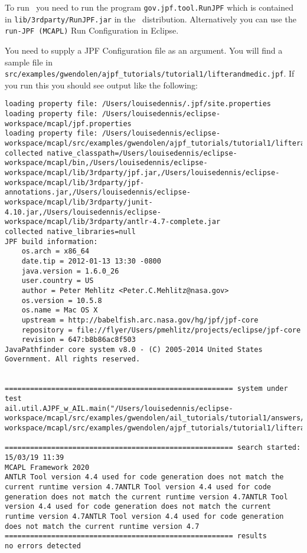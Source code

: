 To run \ajpf\ you need to run the program \texttt{gov.jpf.tool.RunJPF} which is contained in \texttt{lib/3rdparty/RunJPF.jar} in the \mcapl\ distribution.  Alternatively you can use the \texttt{run-JPF (MCAPL)} Run Configuration in Eclipse.

You need to supply a JPF Configuration file as an argument.  You will find a sample file in \texttt{src/examples/gwendolen/ajpf\_tutorials/tutorial1/lifterandmedic.jpf}.  If you run this you should see output like the following:

\begin{verbatim}
loading property file: /Users/louisedennis/.jpf/site.properties
loading property file: /Users/louisedennis/eclipse-workspace/mcapl/jpf.properties
loading property file: /Users/louisedennis/eclipse-workspace/mcapl/src/examples/gwendolen/ajpf_tutorials/tutorial1/lifterandmedic.jpf
collected native_classpath=/Users/louisedennis/eclipse-workspace/mcapl/bin,/Users/louisedennis/eclipse-workspace/mcapl/lib/3rdparty/jpf.jar,/Users/louisedennis/eclipse-workspace/mcapl/lib/3rdparty/jpf-annotations.jar,/Users/louisedennis/eclipse-workspace/mcapl/lib/3rdparty/junit-4.10.jar,/Users/louisedennis/eclipse-workspace/mcapl/lib/3rdparty/antlr-4.7-complete.jar
collected native_libraries=null
JPF build information:
	os.arch = x86_64
	date.tip = 2012-01-13 13:30 -0800
	java.version = 1.6.0_26
	user.country = US
	author = Peter Mehlitz <Peter.C.Mehlitz@nasa.gov>
	os.version = 10.5.8
	os.name = Mac OS X
	upstream = http://babelfish.arc.nasa.gov/hg/jpf/jpf-core
	repository = file://flyer/Users/pmehlitz/projects/eclipse/jpf-core
	revision = 647:b8b86ac8f503
JavaPathfinder core system v8.0 - (C) 2005-2014 United States Government. All rights reserved.


====================================================== system under test
ail.util.AJPF_w_AIL.main("/Users/louisedennis/eclipse-workspace/mcapl/src/examples/gwendolen/ail_tutorials/tutorial1/answers/ex2.ail","/Users/louisedennis/eclipse-workspace/mcapl/src/examples/gwendolen/ajpf_tutorials/tutorial1/lifterandmedic.psl","1")

====================================================== search started: 15/03/19 11:39
MCAPL Framework 2020
ANTLR Tool version 4.4 used for code generation does not match the current runtime version 4.7ANTLR Tool version 4.4 used for code generation does not match the current runtime version 4.7ANTLR Tool version 4.4 used for code generation does not match the current runtime version 4.7ANTLR Tool version 4.4 used for code generation does not match the current runtime version 4.7
====================================================== results
no errors detected


\end{verbatim}

